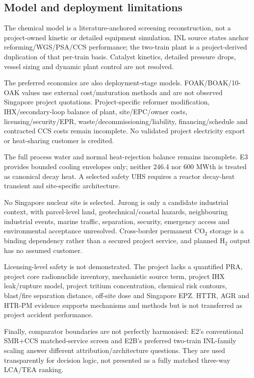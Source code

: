 \subsection{Model and deployment limitations}
The chemical model is a literature-anchored screening reconstruction, not a project-owned kinetic or detailed equipment simulation. INL source states anchor reforming/WGS/PSA/CCS performance; the two-train plant is a project-derived duplication of that per-train basis. Catalyst kinetics, detailed pressure drops, vessel sizing and dynamic plant control are not resolved.

The preferred economics are also deployment-stage models. FOAK/BOAK/10-OAK values use external cost/maturation methods and are not observed Singapore project quotations. Project-specific reformer modification, IHX/secondary-loop balance of plant, site/EPC/owner costs, licensing/security/EPR, waste/decommissioning/liability, financing/schedule and contracted CCS costs remain incomplete. No validated project electricity export or heat-sharing customer is credited.

The full process water and normal heat-rejection balance remains incomplete. E3 provides bounded cooling envelopes only; neither 246.4 nor 600 MWth is treated as canonical decay heat. A selected safety UHS requires a reactor decay-heat transient and site-specific architecture.

No Singapore nuclear site is selected. Jurong is only a candidate industrial context, with parcel-level land, geotechnical/coastal hazards, neighbouring industrial events, marine traffic, separation, security, emergency access and environmental acceptance unresolved. Cross-border permanent CO$_2$ storage is a binding dependency rather than a secured project service, and planned H$_2$ output has no assumed customer.

Licensing-level safety is not demonstrated. The project lacks a quantified PRA, project core radionuclide inventory, mechanistic source term, project IHX leak/rupture model, project tritium concentration, chemical risk contours, blast/fire separation distance, off-site dose and Singapore EPZ. HTTR, AGR and HTR-PM evidence supports mechanisms and methods but is not transferred as project accident performance.

Finally, comparator boundaries are not perfectly harmonised: E2's conventional SMR+CCS matched-service screen and E2B's preferred two-train INL-family scaling answer different attribution/architecture questions. They are used transparently for decision logic, not presented as a fully matched three-way LCA/TEA ranking.
